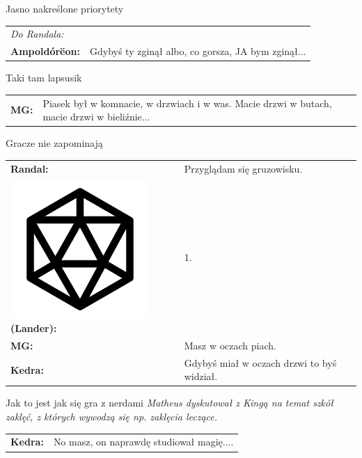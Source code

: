\documentclass[10pt,twoside,twocolumn]{book}
\begin{document}
\begin{rpg-quotebox}{Jasno nakreślone priorytety}
   \begin{tabularx}{\columnwidth}{lX}
      \multicolumn{2}{l}{\textit{Do Randala:}}\\
      \textbf{Ampoldórëon:} & Gdybyś ty zginął albo, co gorsza, JA bym zginął...\\
   \end{tabularx}
\end{rpg-quotebox}


\begin{rpg-quotebox}{Taki tam lapsusik}
   \begin{tabularx}{\columnwidth}{lX}
      \textbf{MG:} & Piasek był w komnacie, w drzwiach i w was. Macie drzwi w butach, macie drzwi w bieliźnie...\\
   \end{tabularx}
\end{rpg-quotebox}


\begin{rpg-quotebox}{Gracze nie zapominają}
   \begin{tabularx}{\columnwidth}{lX}
      \textbf{Randal:} & Przyglądam się gruzowisku.\\
      \includegraphics[scale=0.055]{img/d20.png}\textbf{(Lander):}& 1.\\
      \textbf{MG:} & Masz w oczach piach.\\
      \textbf{Kedra:} & Gdybyś miał w oczach drzwi to byś widział.\\
   \end{tabularx}
\end{rpg-quotebox}


\begin{rpg-quotebox}{Jak to jest jak się gra z nerdami}
   \textit{Matheus dyskutował z Kingą na temat szkół zaklęć, z których wywodzą się np. zaklęcia leczące.}\\

   \begin{tabularx}{\columnwidth}{lX}
      \textbf{Kedra:} & No masz, on naprawdę studiował magię....\\
   \end{tabularx}
\end{rpg-quotebox}
\end{document}

